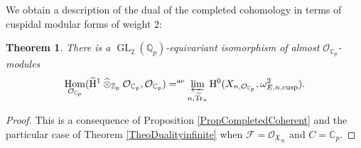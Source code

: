 \documentclass[JEP,XML,SOM,Unicode,published]{cedram}
\newcommand{\rae}{\mathrm{ae}}
\newcommand{\cusp}{\mathrm{cusp}}
\newcommand{\wotimes}{\mathbin{\widehat\otimes}}
\numberwithin{equation}{section}
\newtheorem{theo}[prop]{Theorem}
\theoremstyle{definition}
\newcommand{\bb}[1]{\mathbb{#1}}
\newcommand{\n}[1]{\mathcal{#1}}
\newcommand{\f}[1]{\mathfrak{#1}}
\newcommand{\s}[1]{\mathscr{#1}}
\DeclareMathOperator{\GL}{GL}
\DeclareMathOperator{\Tr}{Tr}
\DeclareMathOperator{\Hom}{Hom}
\begin{document}
We obtain a description of the dual of the completed cohomology in terms of cuspidal modular forms of weight $2$:

\begin{theo}
There is a $\GL_2(\bb{Q}_p)$-equivariant isomorphism of almost $\n{O}_{\bb{C}_p}$-modules
\[
\Hom_{\n{O}_{\bb{C}_p}} (\mathrm{\widetilde{H}}^1 \wotimes_{\bb{Z}_p}\n{O}_{\bb{C}_p} , \n{O}_{\bb{C}_p}) =^{\rae} \varprojlim_{n, \widetilde{\Tr}_n} \mathrm{H}^0(X_{n, \n{O}_{\bb{C}_p}}, \omega^2_{E,n,\cusp}).
\]
\end{theo}

\begin{proof}
This is a consequence of Proposition \ref{PropCompletedCoherent} and the particular case of Theorem \ref{TheoDualityinfinite} when $\n{F}= \s{O}_{\f{X}_{\infty}}$ and $C=\bb{C}_p$.
\end{proof}

\backmatter


\enlargethispage{\baselineskip}
\vspace*{-.5\baselineskip}
\end{document}
